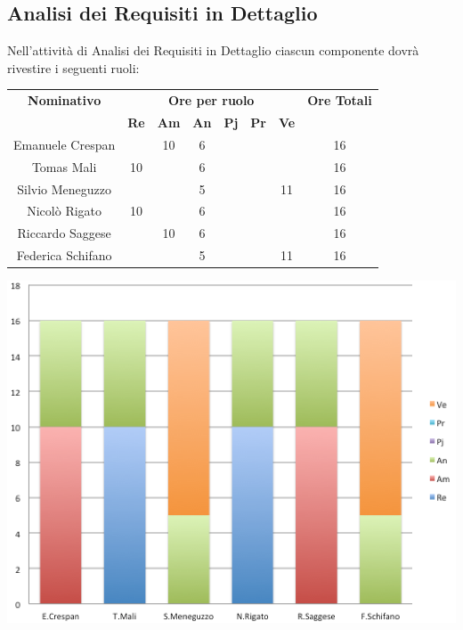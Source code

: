 \subsection{Analisi dei Requisiti in Dettaglio}
Nell'attività di Analisi dei Requisiti in Dettaglio ciascun componente dovrà rivestire i seguenti ruoli:
\begin{center}
  \centering
  \begin{tabular} {|c|c|c|c|c|c|c|c|}
    \hline
    \textbf{Nominativo} & \multicolumn{6}{|c|}{\textbf{Ore per ruolo}} & \textbf{Ore Totali} \\
    & \textbf{Re} & \textbf{Am} & \textbf{An} & \textbf{Pj} & \textbf{Pr} & \textbf{Ve} & \\
    \hline
    Emanuele Crespan & &10 &6 & & & &16 \\
    \hline
    Tomas Mali &10 & &6 & & & &16 \\
    \hline
    Silvio Meneguzzo & & &5 & & &11 &16\\
    \hline
    Nicolò Rigato &10 & &6 & & & &16\\
    \hline
    Riccardo Saggese & &10 &6 & & & &16\\
    \hline
    Federica Schifano & & &5 & & &11 &16\\
    \hline
  \end{tabular}
  \includegraphics[scale=0.65]{img/fig2.png}
\end{center}

